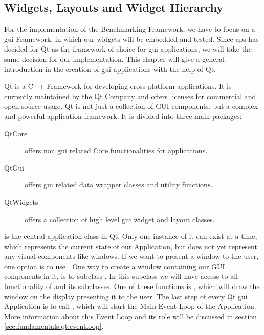 
\subsection{Widgets, Layouts and Widget Hierarchy}
\label{sec:fundamentals:qt:basics}

For the implementation of the Benchmarking Framework, we have to focus on a
\gls{gui} Framework, in which our widgets will be embedded and tested. Since
\gls{aps} has decided for Qt as the framework of choice for \gls{gui}
applications, we will take the same decision for our implementation. This
chapter will give a general introduction in the creation of \gls{gui}
applications with the help of Qt.

Qt is a C++ Framework for developing cross-platform applications. It is
currently maintained by the Qt Company and offers licenses for commercial and
open source usage. Qt is not just a collection of GUI components, but a complex
and powerful application framework. It is divided into three main packages:

\begin{description}
    
    \item[QtCore] offers non \gls{gui} related Core functionalities for
        applications.  

    \item[QtGui] offers \gls{gui} related data wrapper
        classes and utility functions.
    
    \item[QtWidgets] offers a collection of high level \gls{gui} widget and
        layout classes.  

\end{description}

 is the central application class in
Qt. Only one instance of it can exist at a time, which represents the current
state of our Application, but does not yet represent any visual components like
windows. If we want to present a window to the user, one option is to use
. One way to create a window
containing our GUI components in it, is to subclass
. In this subclass we will have access to all
functionality of  and its subclasses. One of
these functions is , which will
draw the window on the display presenting it to the user. The last step of every
Qt \gls{gui} Application is to call
, which will start the Main
Event Loop of the Application. More information about this Event Loop and its
role will be discussed in section \ref{sec:fundamentals:qt:eventloop}.

